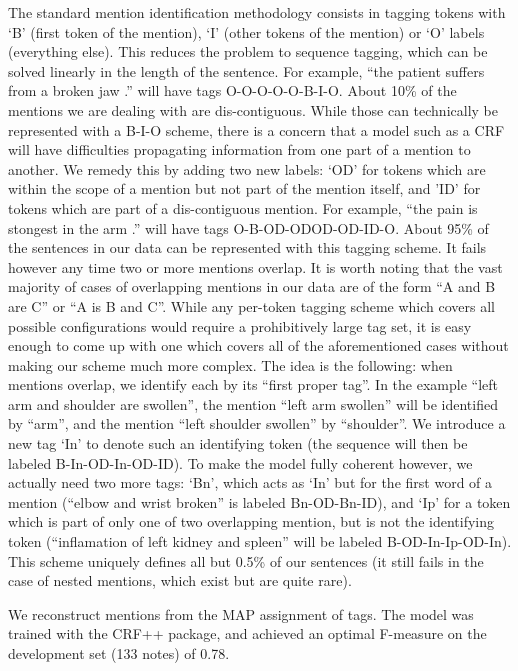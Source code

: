 \documentclass[10pt,a4paper]{article}
\begin{document}
The standard mention identification methodology consists in tagging tokens
with ‘B’ (first token of the mention), ‘I’ (other tokens of the mention) or ‘O’
labels (everything else). This reduces the problem to sequence tagging, which
can be solved linearly in the length of the sentence. For example, “the patient
suffers from a broken jaw .” will have tags O-O-O-O-O-B-I-O.
About 10\% of the mentions we are dealing with are dis-contiguous. While
those can technically be represented with a B-I-O scheme, there is a concern
that a model such as a CRF will have difficulties propagating information from
one part of a mention to another. We remedy this by adding two new labels:
‘OD’ for tokens which are within the scope of a mention but not part of the
mention itself, and ’ID’ for tokens which are part of a dis-contiguous mention.
For example, “the pain is stongest in the arm .” will have tags O-B-OD-ODOD-OD-ID-O.
About 95\% of the sentences in our data can be represented with this tagging
scheme. It fails however any time two or more mentions overlap.
It is worth noting that the vast majority of cases of overlapping mentions
in our data are of the form “A and B are C” or “A is B and C”. While any
per-token tagging scheme which covers all possible configurations would require
a prohibitively large tag set, it is easy enough to come up with one which covers
all of the aforementioned cases without making our scheme much more complex.
The idea is the following: when mentions overlap, we identify each by its
“first proper tag”. In the example “left arm and shoulder are swollen”, the
mention “left arm swollen” will be identified by “arm”, and the mention “left
shoulder swollen” by “shoulder”. We introduce a new tag ‘In’ to denote such
an identifying token (the sequence will then be labeled B-In-OD-In-OD-ID).
To make the model fully coherent however, we actually need two more tags:
‘Bn’, which acts as ‘In’ but for the first word of a mention (“elbow and wrist
broken” is labeled Bn-OD-Bn-ID), and ‘Ip’ for a token which is part of only one
of two overlapping mention, but is not the identifying token (“inflamation of
left kidney and spleen” will be labeled B-OD-In-Ip-OD-In).
This scheme uniquely defines all but 0.5\% of our sentences (it still fails in
the case of nested mentions, which exist but are quite rare).

 We reconstruct mentions from the MAP assignment of tags. The model was trained with the CRF++ package, and achieved an optimal F-measure on the development set (133 notes) of 0.78.
\end{document}
